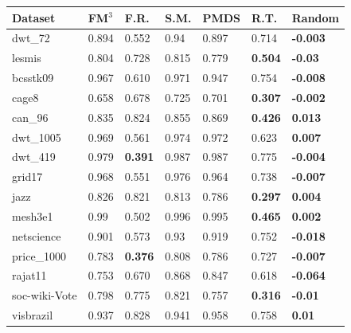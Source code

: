\begin{table}[ht]
{%
\begin{tabular}{lllllll}
\hline
Dataset       & FM$^3$ & F.R.           & S.M.  & PMDS  & R.T.           & Random          \\ \hline
dwt\_72       & 0.894                 & 0.552          & 0.94  & 0.897 & 0.714          & \textbf{-0.003} \\
lesmis        & 0.804                 & 0.728          & 0.815 & 0.779 & \textbf{0.504} & \textbf{-0.03}  \\
bcsstk09      & 0.967                 & 0.610          & 0.971 & 0.947 & 0.754          & \textbf{-0.008} \\
cage8         & 0.658                 & 0.678          & 0.725 & 0.701 & \textbf{0.307} & \textbf{-0.002} \\
can\_96       & 0.835                 & 0.824          & 0.855 & 0.869 & \textbf{0.426} & \textbf{0.013}  \\
dwt\_1005     & 0.969                 & 0.561          & 0.974 & 0.972 & 0.623          & \textbf{0.007}  \\
dwt\_419      & 0.979                 & \textbf{0.391} & 0.987 & 0.987 & 0.775          & \textbf{-0.004} \\
grid17        & 0.968                 & 0.551          & 0.976 & 0.964 & 0.738          & \textbf{-0.007} \\
jazz          & 0.826                 & 0.821          & 0.813 & 0.786 & \textbf{0.297} & \textbf{0.004}  \\
mesh3e1       & 0.99                  & 0.502          & 0.996 & 0.995 & \textbf{0.465} & \textbf{0.002}  \\
netscience    & 0.901                 & 0.573          & 0.93  & 0.919 & 0.752          & \textbf{-0.018} \\
price\_1000   & 0.783                 & \textbf{0.376} & 0.808 & 0.786 & 0.727          & \textbf{-0.007} \\
rajat11       & 0.753                 & 0.670          & 0.868 & 0.847 & 0.618          & \textbf{-0.064} \\
soc-wiki-Vote & 0.798                 & 0.775          & 0.821 & 0.757 & \textbf{0.316} & \textbf{-0.01}  \\
visbrazil     & 0.937                 & 0.828          & 0.941 & 0.958 & 0.758          & \textbf{0.01}   \\ \hline
\end{tabular}}
\end{table}

